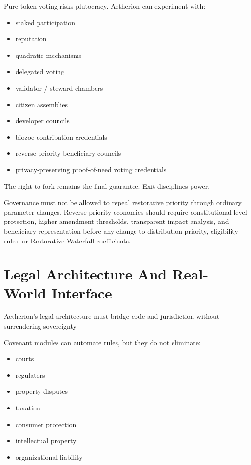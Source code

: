 ﻿\documentclass[12pt]{article}
\begin{document}
Pure token voting risks plutocracy. Aetherion can experiment with:

\begin{itemize}
  \item staked participation
  \item reputation
  \item quadratic mechanisms
  \item delegated voting
  \item validator / steward chambers
  \item citizen assemblies
  \item developer councils
  \item biozoe contribution credentials
  \item reverse-priority beneficiary councils
  \item privacy-preserving proof-of-need voting credentials
\end{itemize}

The right to fork remains the final guarantee. Exit disciplines power.

Governance must not be allowed to repeal restorative priority through ordinary parameter changes. Reverse-priority economics should require constitutional-level protection, higher amendment thresholds, transparent impact analysis, and beneficiary representation before any change to distribution priority, eligibility rules, or Restorative Waterfall coefficients.

\section{Legal Architecture And Real-World Interface}


Aetherion's legal architecture must bridge code and jurisdiction without surrendering sovereignty.

Covenant modules can automate rules, but they do not eliminate:

\begin{itemize}
  \item courts
  \item regulators
  \item property disputes
  \item taxation
  \item consumer protection
  \item intellectual property
  \item organizational liability
\end{itemize}
\end{document}
